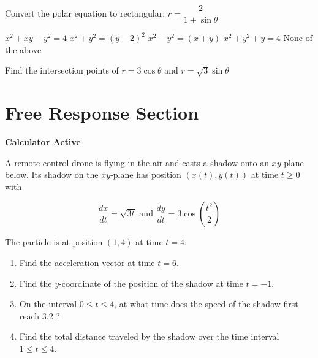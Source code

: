 \documentclass[11pt]{exam}
\begin{document}
\begin{questions}
\begin{minipage}{\linewidth}
\question Convert the polar equation to rectangular: $r = \dfrac{2}{1 + \sin \theta}$

\begin{choices}
	\choice $x^2 + xy - y^2 = 4$
	\correctchoice $x^2 + y^2 = (y-2)^2$
	\choice $x^2 - y^2 = (x+y)$
	\choice $x^2+y^2 + y = 4$
	\choice None of the above
\end{choices} \answerline
\end{minipage}

\begin{minipage}{\linewidth}


\question Find the intersection points of $r = 3 \cos \theta$ and $r = \sqrt3 \sin \theta$

\begin{choices}

\end{choices} \answerline
\end{minipage}

\end{questions}

\clearpage
\section*{Free Response Section}
\noindent
\textbf{Calculator Active}
\vspace{2ex}

A remote control drone is flying in the air and casts a shadow onto
an $xy$ plane below. Its shadow on the $x y$-plane has position $(x(t), y(t))$ at time $t \geq 0$ with

$$
\frac{d x}{d t}=\sqrt{3 t} \text { and } \frac{d y}{d t}=3 \cos \left(\frac{t^{2}}{2}\right)
$$

The particle is at position $(1,4)$ at time $t=4$.
\begin{enumerate}
\item Find the acceleration vector at time $t=6$.
\vspace{1in}
\item Find the $y$-coordinate of the position of the shadow at time $t=-1$.
\vspace{1in}
\item On the interval $0 \leq t \leq 4$, at what time does the speed of the shadow first reach 3.2 ?
\vspace{2in}
\item Find the total distance traveled by the shadow over the time interval $1 \leq t \leq 4$.
\end{enumerate}
\end{document}
